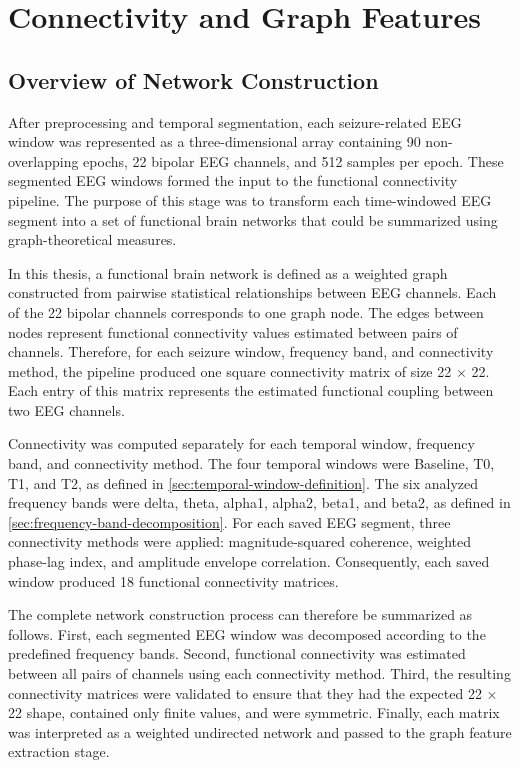 \chapter{Connectivity and Graph Features}
\label{chap:connectivity-graph-features}

\section{Overview of Network Construction}
\label{sec:functional-network-construction-overview}

After preprocessing and temporal segmentation, each seizure-related EEG window
was represented as a three-dimensional array containing \num{90}
non-overlapping epochs, \num{22} bipolar EEG channels, and \num{512} samples per
epoch. These segmented EEG windows formed the input to the functional
connectivity pipeline. The purpose of this stage was to transform each
time-windowed EEG segment into a set of functional brain networks that could be
summarized using graph-theoretical measures.

In this thesis, a functional brain network is defined as a weighted graph
constructed from pairwise statistical relationships between EEG channels. Each
of the \num{22} bipolar channels corresponds to one graph node. The edges
between nodes represent functional connectivity values estimated between pairs
of channels. Therefore, for each seizure window, frequency band, and
connectivity method, the pipeline produced one square connectivity matrix of
size \num{22} $\times$ \num{22}. Each entry of this matrix represents the
estimated functional coupling between two EEG channels.

Connectivity was computed separately for each temporal window, frequency band,
and connectivity method. The four temporal windows were Baseline, T0, T1, and
T2, as defined in \cref{sec:temporal-window-definition}. The six analyzed
frequency bands were delta, theta, alpha1, alpha2, beta1, and beta2, as defined
in \cref{sec:frequency-band-decomposition}. For each saved EEG segment, three
connectivity methods were applied: magnitude-squared coherence, weighted
phase-lag index, and amplitude envelope correlation. Consequently, each saved
window produced 18 functional connectivity matrices.

The complete network construction process can therefore be summarized as
follows. First, each segmented EEG window was decomposed according to the
predefined frequency bands. Second, functional connectivity was estimated
between all pairs of channels using each connectivity method. Third, the
resulting connectivity matrices were validated to ensure that they had the
expected \num{22} $\times$ \num{22} shape, contained only finite values, and were
symmetric. Finally, each matrix was interpreted as a weighted undirected network
and passed to the graph feature extraction stage.

